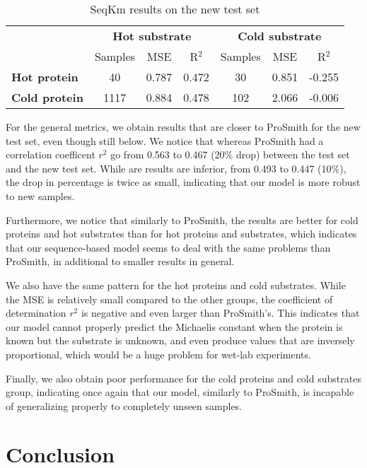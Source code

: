 \begin{table}[ht]
  \centering
  \begin{tabular}{lcccccc}
  \hline
   & \multicolumn{3}{c}{\textbf{Hot substrate}} & \multicolumn{3}{c}{\textbf{Cold substrate}} \\
   & Samples & MSE & R\(^2\) & Samples & MSE & R\(^2\) \\ \hline
  \textbf{Hot protein} & 40 & 0.787 & 0.472 & 30 & 0.851 & -0.255 \\
  \textbf{Cold protein} & 1117 & 0.884 & 0.478 & 102 & 2.066 & -0.006 \\ \hline
  \end{tabular}
  \caption{SeqKm results on the new test set}
  \label{tab:seqkm_new_test}
\end{table}

For the general metrics, we obtain results that are closer to ProSmith for the new test set, even though still below. We notice that whereas ProSmith had a correlation coefficent $r^2$ go from 0.563 to 0.467 (20\% drop) between the test set and the new test set. While are results are inferior, from 0.493 to 0.447 (10\%), the drop in percentage is twice as small, indicating that our model is more robust to new samples.

Furthermore, we notice that similarly to ProSmith, the results are better for cold proteins and hot substrates than for hot proteins and substrates, which indicates that our sequence-based model seems to deal with the same problems than ProSmith, in additional to smaller results in general.

We also have the same pattern for the hot proteins and cold substrates. While the MSE is relatively small compared to the other groups, the coefficient of determination $r^2$ is negative and even larger than ProSmith's. This indicates that our model cannot properly predict the Michaelis constant when the protein is known but the substrate is unknown, and even produce values that are inversely proportional, which would be a huge problem for wet-lab experiments.

Finally, we also obtain poor performance for the cold proteins and cold substrates group, indicating once again that our model, similarly to ProSmith, is incapable of generalizing properly to completely unseen samples.

\section{Conclusion}


